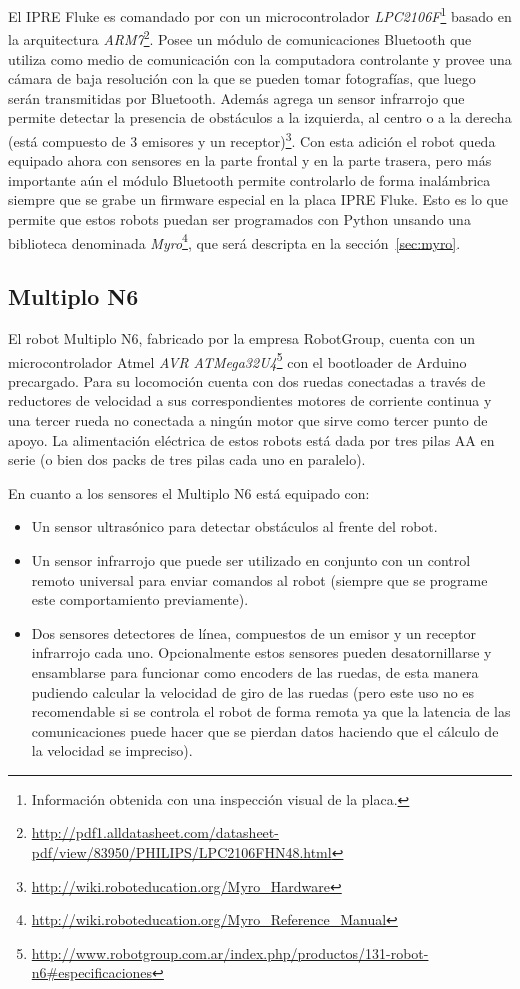 El IPRE Fluke es comandado por con un microcontrolador
\textit{LPC2106F}\footnote{Información obtenida con una inspección visual
de la placa.}
basado en la arquitectura
\textit{ARM7}\footnote{\url{http://pdf1.alldatasheet.com/datasheet-pdf/view/83950/PHILIPS/LPC2106FHN48.html}}. Posee un módulo de comunicaciones
Bluetooth que utiliza como medio de comunicación con la computadora
controlante y
provee una cámara de baja resolución con la que se pueden tomar fotografías,
que luego serán transmitidas por Bluetooth. Además agrega
un sensor infrarrojo que permite detectar la presencia de obstáculos
a la izquierda, al centro o a la derecha (está compuesto de 3 emisores
y un
receptor)\footnote{\url{http://wiki.roboteducation.org/Myro_Hardware}}.
Con esta adición el robot queda equipado ahora con sensores
en la parte frontal y en la parte trasera, pero más importante aún
el módulo Bluetooth permite controlarlo de forma inalámbrica siempre
que se grabe un firmware especial en la placa IPRE Fluke. Esto es lo que permite
que estos robots puedan ser programados con Python unsando una biblioteca denominada
\textit{Myro}\footnote{\url{http://wiki.roboteducation.org/Myro_Reference_Manual}},
que será descripta en la sección~\ref{sec:myro}.

\subsection{Multiplo N6}
El robot Multiplo N6, fabricado por la empresa RobotGroup, cuenta con un
microcontrolador Atmel
\textit{AVR ATMega32U4}\footnote{\url{http://www.robotgroup.com.ar/index.php/productos/131-robot-n6\#especificaciones}}
con el bootloader de Arduino
precargado. Para su locomoción cuenta con dos ruedas conectadas a través
de reductores de velocidad a sus correspondientes motores de
corriente continua y una tercer
rueda no conectada a ningún motor que sirve como tercer punto de apoyo.
La alimentación eléctrica de estos robots está dada por tres pilas AA
en serie (o bien dos packs de tres pilas cada uno en paralelo).

En cuanto a los sensores el Multiplo N6 está equipado con:
\begin{itemize}
    \item Un sensor ultrasónico para detectar obstáculos al frente del
        robot.
    \item Un sensor infrarrojo que puede ser utilizado en conjunto con
        un control remoto universal para enviar comandos al robot
        (siempre que se programe este comportamiento previamente).
    \item Dos sensores detectores de línea, compuestos de un emisor y
        un receptor infrarrojo cada uno. Opcionalmente estos sensores
        pueden desatornillarse y ensamblarse
        para funcionar como encoders de las ruedas, de esta manera pudiendo
        calcular la velocidad de giro de las ruedas (pero este uso
        no es recomendable si se controla el robot de forma remota
        ya que la latencia de las comunicaciones puede hacer que se pierdan
        datos haciendo que el cálculo de la velocidad se impreciso).
\end{itemize}

